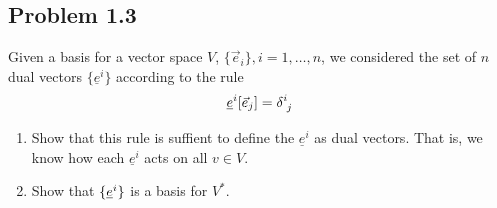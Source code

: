 	\subsection*{
		Problem 1.3
	}
	\begin{problem}
		Given a basis for a vector space $V$, $\{\vec{e}_i\}, i = 1,\ldots,n$, we considered
		the set of $n$ dual vectors $\{\underline{e}^i\}$ according to the rule
		\begin{equation}
			\label{eq:1.3.1}
			\underline{e}^i[\vec{e}_j] = \tensor{\delta}{^i_j}
		\end{equation}
		\begin{enumerate}[(1)]
			\item Show that this rule is suffient to define the $\underline{e}^i$  as dual
				vectors. That is, we know how each $\underline{e}^i$ acts on all $v\in V$.
			\item Show that $\{\underline{e}^i\}$ is a basis for $V^*$.
		\end{enumerate}
	\end{problem}
